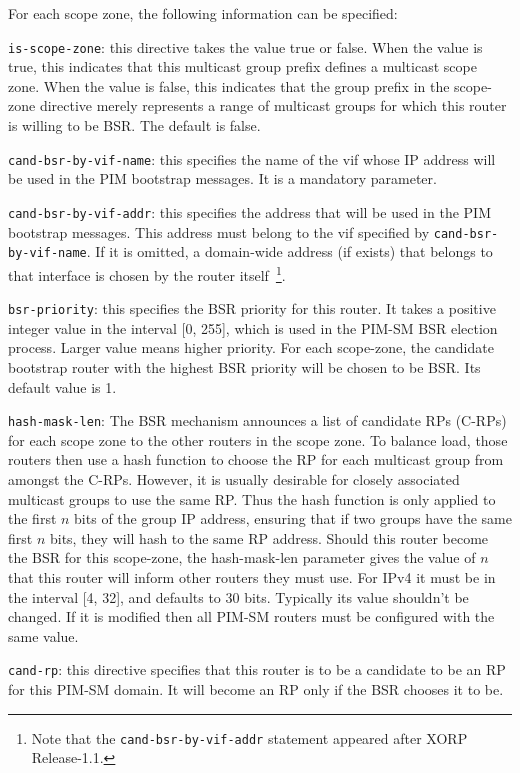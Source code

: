 \begin{description}
\begin{description}
\begin{description}
  For each scope zone, the following information can be specified: 
\begin{description}
\item{\tt is-scope-zone}: this directive takes the value {\stt true}
  or {\stt false}.  When the value is {\stt true}, this indicates that
  this multicast group prefix defines a multicast scope zone.  When
  the value is {\stt false}, this indicates that the group prefix in
  the {\stt scope-zone} directive merely represents a range of
  multicast groups for which this router is willing to be BSR.  The
  default is {\stt false}.
\item{\tt cand-bsr-by-vif-name}: this specifies the name of the {\stt
  vif} whose IP address will be used in the PIM bootstrap messages.  It
  is a mandatory parameter.
\item{\tt cand-bsr-by-vif-addr}: this specifies the address that will be used
  in the PIM bootstrap messages. This address must belong to the vif
  specified by {\tt cand-bsr-by-vif-name}. If it is omitted, a domain-wide
  address (if exists) that belongs to that interface is chosen by the router
  itself~\footnote{Note that the {\tt cand-bsr-by-vif-addr} statement
  appeared after XORP Release-1.1.}.
\item{\tt bsr-priority}: this specifies the BSR priority for this
  router.  It takes a positive integer value in the interval [0, 255],
  which is used in the PIM-SM BSR election process. Larger value means higher
  priority. For each {\stt scope-zone}, the
  candidate bootstrap router with the highest BSR priority will be
  chosen to be BSR. Its default value is 1.
\item{\tt hash-mask-len}: The BSR mechanism announces a list of
  candidate RPs (C-RPs) for each scope zone to the other routers in
  the scope zone.  To balance load, those routers then use a hash
  function to choose the RP for each multicast group from amongst the
  C-RPs.  However, it is usually desirable for closely associated
  multicast groups to use the same RP.  Thus the hash function is only
  applied to the first $n$ bits of the group IP address, ensuring that
  if two groups have the same first $n$ bits, they will hash to the
  same RP address.  Should this router become the BSR for this
  scope-zone, the {\stt hash-mask-len} parameter gives the value of
  $n$ that this router will inform other routers they must use.
  For IPv4 it must be in the interval [4, 32], and defaults to 30 bits.
  Typically its value shouldn't be changed.
  If it is modified then all PIM-SM routers must be configured with the
  same value.
\end{description}
\end{description}
\end{description}
\item{\tt cand-rp}: this directive specifies that this router is to be
  a candidate to be an RP for this PIM-SM domain.  It will become an
  RP only if the BSR chooses it to be.  


\end{description}
